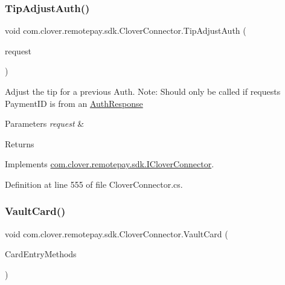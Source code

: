 \subsubsection{\texorpdfstring{Tip\+Adjust\+Auth()}{TipAdjustAuth()}}
{\footnotesize\ttfamily void com.\+clover.\+remotepay.\+sdk.\+Clover\+Connector.\+Tip\+Adjust\+Auth (\begin{DoxyParamCaption}\item[{\hyperlink{classcom_1_1clover_1_1remotepay_1_1sdk_1_1_tip_adjust_auth_request}{Tip\+Adjust\+Auth\+Request}}]{request }\end{DoxyParamCaption})}



Adjust the tip for a previous Auth. Note\+: Should only be called if request\textquotesingle{}s Payment\+ID is from an \hyperlink{classcom_1_1clover_1_1remotepay_1_1sdk_1_1_auth_response}{Auth\+Response} 


\begin{DoxyParams}{Parameters}
{\em request} & \\
\hline
\end{DoxyParams}
\begin{DoxyReturn}{Returns}

\end{DoxyReturn}


Implements \hyperlink{interfacecom_1_1clover_1_1remotepay_1_1sdk_1_1_i_clover_connector_a815c8be2012ebda06247c059771717cc}{com.\+clover.\+remotepay.\+sdk.\+I\+Clover\+Connector}.



Definition at line 555 of file Clover\+Connector.\+cs.

\mbox{\label{classcom_1_1clover_1_1remotepay_1_1sdk_1_1_clover_connector_a26e95230422276f47542882628b5038f}} 
\subsubsection{\texorpdfstring{Vault\+Card()}{VaultCard()}}
{\footnotesize\ttfamily void com.\+clover.\+remotepay.\+sdk.\+Clover\+Connector.\+Vault\+Card (\begin{DoxyParamCaption}\item[{int?}]{Card\+Entry\+Methods }\end{DoxyParamCaption})}



